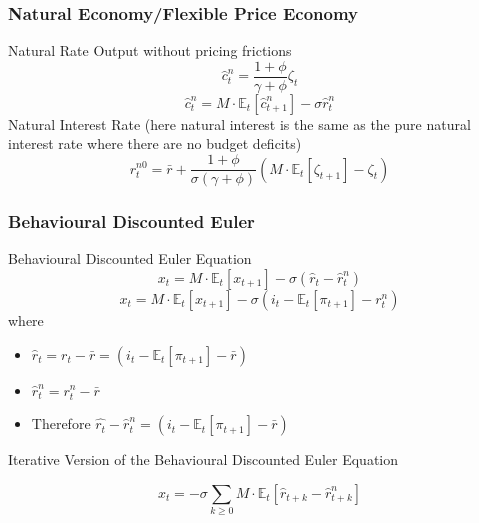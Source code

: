 \documentclass{beamer}
\begin{document}
\subsubsection{Natural Economy/Flexible Price Economy}
\begin{frame}{\subsecname}

Natural Rate Output without pricing frictions
\begin{equation}\tag{21}
    \hat{c}_{t}^{n}=\frac{1+\phi}{\gamma+\phi}\zeta_{t}
\end{equation}
\begin{equation}\tag{22}
    \hat{c}^{n}_{t} = M\cdot\mathbb{E}_{t}\left[\hat{c}^{n}_{t+1}\right]-\sigma\hat{r}^{n}_{t}
\end{equation}
Natural Interest Rate (here natural interest is the same as the pure natural interest rate where there are no budget deficits)
\begin{equation}\tag{23}
    r^{n0}_{t}=\bar{r}+\frac{1+\phi}{\sigma(\gamma+\phi)}\left(M\cdot\mathbb{E}_{t}\left[\zeta_{t+1}\right]-\zeta_{t}\right)
\end{equation}
\end{frame}

\subsubsection{Behavioural Discounted Euler}
\begin{frame}{\subsecname}
Behavioural Discounted Euler Equation
\begin{equation}\tag{24}
    x_{t}=M\cdot\mathbb{E}_{t}\left[x_{t+1}\right]-\sigma(\hat{r}_{t}-\hat{r}^{n}_{t})
\end{equation}
\begin{equation}\tag{25}
    x_{t}=M\cdot\mathbb{E}_{t}\left[x_{t+1}\right]-\sigma(i_{t}-\mathbb{E}_{t}\left[\pi_{t+1}\right]-r^{n}_{t})
\end{equation}
 where
\begin{itemize}
    \item $\hat r_{t}= r_{t}- \bar r = (i_{t}-\mathbb{E}_{t}\left[\pi_{t+1}\right]-\bar{r})$
    \item $\hat r_{t}^{n}= r_{t}^{n}- \bar r$ 
    \item Therefore $\hat{r_{t}}-\hat{r}^{n}_{t}=(i_{t}-\mathbb{E}_{t}\left[\pi_{t+1}\right]-\bar{r})$
\end{itemize}

Iterative Version of the Behavioural Discounted Euler Equation

\begin{equation}\tag{26}
    x_{t}=-\sigma\sum_{k\geq 0}{M\cdot \mathbb{E}_{t}\left[\hat{r}_{t+k}-\hat{r}_{t+k}^{n}\right]}
\end{equation}

\end{frame}
\end{document}

